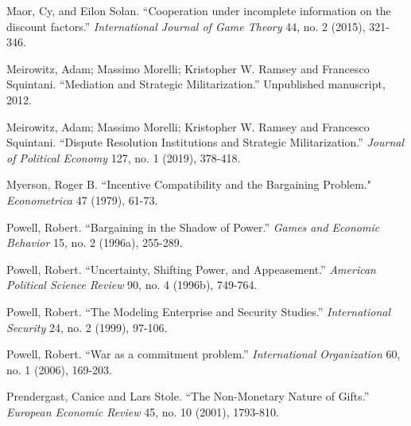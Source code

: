 \documentclass[12pt, letterpaper]{article}
\begin{document}
{\begin{list}{}{\setlength{\leftmargin}{0.0in}\setlength{\rightmargin}{0.0in}\setlength{\itemindent}{0.0in}\setlength{\itemsep}{0.05in}}

\item Maor, Cy, and Eilon Solan. ``Cooperation under incomplete information on the discount factors.'' \emph{International Journal of Game Theory} 44, no. 2 (2015), 321-346.

\item Meirowitz, Adam; Massimo Morelli; Kristopher W. Ramsey and Francesco Squintani. ``Mediation and Strategic Militarization.'' Unpublished manuscript, 2012.

\item Meirowitz, Adam; Massimo Morelli; Kristopher W. Ramsey and Francesco Squintani. ``Dispute Resolution Institutions
and Strategic Militarization.'' \emph{Journal of Political Economy} 127, no. 1 (2019), 378-418.

\item Myerson, Roger B. ``Incentive Compatibility and the Bargaining Problem." \emph {Econometrica} 47 (1979), 61-73. 


\item Powell, Robert. ``Bargaining in the Shadow of Power.'' \emph{Games and Economic Behavior} 15, no. 2 (1996a), 255-289.

\item Powell, Robert. ``Uncertainty, Shifting Power, and Appeasement.'' \emph{American Political Science Review} 90, no. 4 (1996b), 749-764.

\item Powell, Robert. ``The Modeling Enterprise and Security Studies.'' \emph{International Security} 24, no. 2 (1999), 97-106.

\item Powell, Robert. ``War as a commitment problem.'' \emph{International Organization} 60, no. 1 (2006), 169-203.

\item Prendergast, Canice and Lars Stole. ``The Non-Monetary Nature of Gifts.'' \emph {European Economic Review} 45, no. 10 (2001), 1793-810. 



\end{list}}
\end{document}
